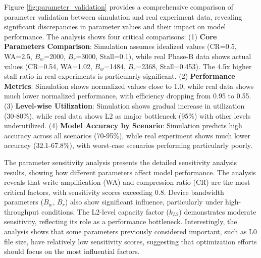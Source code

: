 \documentclass[11pt]{article}
\begin{document}
Figure \ref{fig:parameter_validation} provides a comprehensive comparison of parameter validation between simulation and real experiment data, revealing significant discrepancies in parameter values and their impact on model performance. The analysis shows four critical comparisons: (1) \textbf{Core Parameters Comparison}: Simulation assumes idealized values (CR=0.5, WA=2.5, $B_w$=2000, $B_r$=3000, Stall=0.1), while real Phase-B data shows actual values (CR=0.54, WA=1.02, $B_w$=1484, $B_r$=2368, Stall=0.453). The 4.5x higher stall ratio in real experiments is particularly significant. (2) \textbf{Performance Metrics}: Simulation shows normalized values close to 1.0, while real data shows much lower normalized performance, with efficiency dropping from 0.95 to 0.55. (3) \textbf{Level-wise Utilization}: Simulation shows gradual increase in utilization (30-80\%), while real data shows L2 as major bottleneck (95\%) with other levels underutilized. (4) \textbf{Model Accuracy by Scenario}: Simulation predicts high accuracy across all scenarios (70-95\%), while real experiment shows much lower accuracy (32.1-67.8\%), with worst-case scenarios performing particularly poorly.

The parameter sensitivity analysis presents the detailed sensitivity analysis results, showing how different parameters affect model performance. The analysis reveals that write amplification (WA) and compression ratio (CR) are the most critical factors, with sensitivity scores exceeding 0.8. Device bandwidth parameters ($B_w$, $B_r$) also show significant influence, particularly under high-throughput conditions. The L2-level capacity factor ($k_{L2}$) demonstrates moderate sensitivity, reflecting its role as a performance bottleneck. Interestingly, the analysis shows that some parameters previously considered important, such as L0 file size, have relatively low sensitivity scores, suggesting that optimization efforts should focus on the most influential factors.
\end{document}
